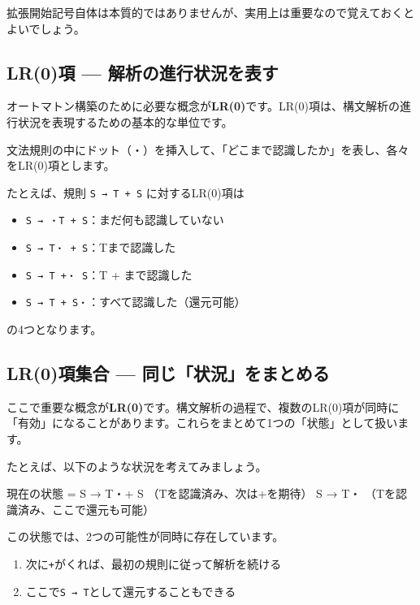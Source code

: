 拡張開始記号自体は本質的ではありませんが、実用上は重要なので覚えておくとよいでしょう。

\subsection{LR(0)項 --- 解析の進行状況を表す}

オートマトン構築のために必要な概念が\textbf{\sffamily LR(0)}です。LR(0)項は、構文解析の進行状況を表現するための基本的な単位です。

文法規則の中にドット（・）を挿入して、「どこまで認識したか」を表し、各々をLR(0)項とします。

たとえば、規則 \texttt{S\ →\ T\ +\ S} に対するLR(0)項は

\begin{itemize}
\item
  \texttt{S\ →\ ・T\ +\ S}：まだ何も認識していない
\item
  \texttt{S\ →\ T・\ +\ S}：Tまで認識した
\item
  \texttt{S\ →\ T\ +・\ S}：T + まで認識した
\item
  \texttt{S\ →\ T\ +\ S・}：すべて認識した（還元可能）
\end{itemize}

\noindent の4つとなります。

\subsection{LR(0)項集合 --- 同じ「状況」をまとめる}

ここで重要な概念が\textbf{\sffamily LR(0)}です。構文解析の過程で、複数のLR(0)項が同時に「有効」になることがあります。これらをまとめて1つの「状態」として扱います。

たとえば、以下のような状況を考えてみましょう。

\begin{codescreen}{}
現在の状態 = {
    S → T・+ S    （Tを認識済み、次は+を期待）
    S → T・       （Tを認識済み、ここで還元も可能）
}
\end{codescreen}

この状態では、2つの可能性が同時に存在しています。

\begin{enumerate}
\item
  次に\texttt{+}がくれば、最初の規則に従って解析を続ける
\item
  ここで\texttt{S\ →\ T}として還元することもできる
\end{enumerate}

